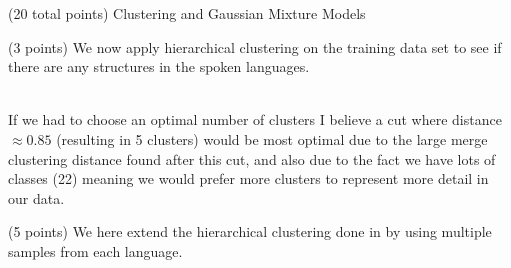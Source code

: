 \documentclass[12pt]{article}
\begin{document}
\begin{question}{(20 total points) Clustering and Gaussian Mixture Models}
\begin{subquestion}{(3 points)
       We now apply hierarchical clustering on the training data set
       to see if there are any structures in the spoken languages.
     }
\begin{answerbox}{35em}
{\\
        If we had to choose an optimal number of clusters I believe a cut where distance $\approx 0.85$ (resulting in 5 clusters) would be most optimal due to the large merge clustering distance found after this cut, and also due to the fact we have lots of classes (22) meaning we would prefer more clusters to represent more detail in our data.
        }
      \end{answerbox}
  


   \end{subquestion}
   \begin{subquestion}{(5 points)
       We here extend the hierarchical clustering done in  by
       using multiple samples from each language.
     } \label{Q3.4}


   


\end{subquestion}
\end{question}
\end{document}

